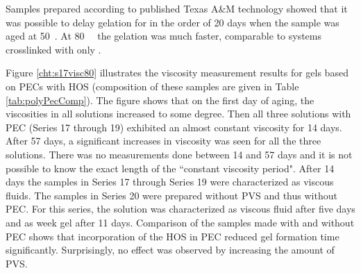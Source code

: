 \documentclass[energies,article,submit,moreauthors,pdftex]{Definitions/mdpi}
\begin{document}
Samples prepared according to published Texas A\&M technology showed that it was possible to delay gelation for in the order of 20 days when the sample was aged at 50~\celsius. At 80~\celsius~ the gelation was much faster, comparable to systems crosslinked with only .



Figure \ref{cht:s17visc80} illustrates the viscosity measurement results for gels based on PECs with HOS (composition of these samples are given in Table \ref{tab:polyPecComp}). The figure shows that on the first day of aging, the viscosities in all solutions increased to some degree. Then all three solutions with PEC (Series 17 through 19) exhibited an almost constant viscosity for 14 days. After 57 days, a significant increases in viscosity was seen for all the three solutions. There was no measurements done between 14 and 57 days and it is not possible to know the exact length of the ``constant viscosity period". After 14 days the samples in Series 17 through Series 19 were characterized as viscous fluids. The samples in Series 20 were prepared without PVS and thus without PEC. For this series, the solution was characterized as viscous fluid after five days and as week gel after 11 days. Comparison of the samples made with and without PEC shows that incorporation of the HOS in PEC reduced gel formation time significantly. Surprisingly, no effect was observed by increasing the amount of PVS.
\end{document}

